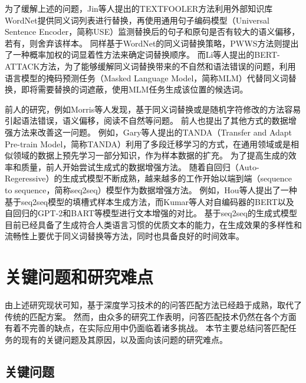 为了缓解上述的问题，Jin等人提出的TEXTFOOLER\cite{jin2020bert}方法利用外部知识库WordNet提供同义词列表进行替换，再使用通用句子编码模型（Universal Sentence Encoder，简称USE）\cite{cer2018universal}监测替换后的句子和原句是否有较大的语义偏移，若有，则舍弃该样本。
同样基于WordNet的同义词替换策略，PWWS方法\cite{ren-etal-2019-generating}则提出了一种概率加权的词显着性方法来确定词替换顺序。
而Li等人提出的BERT-ATTACK\cite{li2020bert}方法，为了能够缓解同义词替换带来的不自然和语法错误的问题，利用语言模型的掩码预测任务（Masked Language Model，简称MLM）代替同义词替换，即将需要替换的词遮蔽，使用MLM任务生成该位置的候选词。

前人的研究，例如Morris等人\cite{morris-etal-2020-reevaluating}发现，基于同义词替换或是随机字符修改的方法容易引起语法错误，语义偏移，阅读不自然等问题。
前人也提出了其他方式的数据增强方法来改善这一问题。
例如，Gary等人\cite{garg2020tanda}提出的TANDA（Transfer and Adapt Pre-train Model，简称TANDA）利用了多段迁移学习的方式，在通用领域或是相似领域的数据上预先学习一部分知识，作为样本数据的扩充。
为了提高生成的效率和质量，前人开始尝试生成式的数据增强方法。
随着自回归（Auto-Regeressive）的生成式模型不断成熟，越来越多的工作开始以端到端（sequence to sequence，简称seq2seq）模型作为数据增强方法。
例如，Hou等人\cite{hou-etal-2018-sequence}提出了一种基于seq2seq模型的填槽式样本生成方法，而Kumar等人\cite{kumar-etal-2020-data}对自编码器的BERT以及自回归的GPT-2\cite{radford2019language}和BART\cite{lewis2019bart}等模型进行文本增强的对比。
基于seq2seq的生成式模型目前已经具备了生成符合人类语言习惯的优质文本的能力，在生成效果的多样性和流畅性上要优于同义词替换等方法，同时也具备良好的时间效率。




\section{关键问题和研究难点}

由上述研究现状可知，基于深度学习技术的的问答匹配方法已经趋于成熟，取代了传统的匹配方案。
然而，由众多的研究工作表明，问答匹配技术仍然在各个方面有着不完善的缺点，在实际应用中仍面临着诸多挑战。
本节主要总结问答匹配任务的现有的关键问题及其原因，以及面向该问题的研究难点。

\subsection{关键问题}


